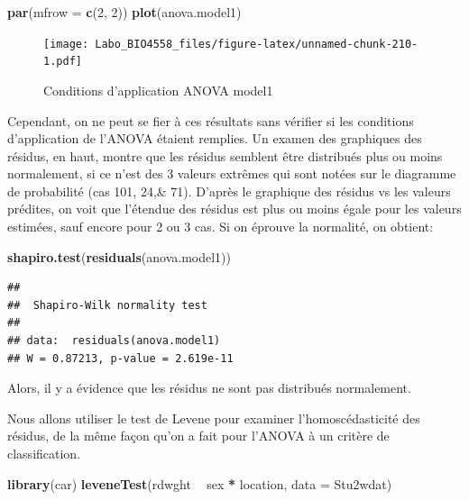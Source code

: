 \documentclass[12pt,]{book}
\newenvironment{Shaded}{\begin{snugshade}}{\end{snugshade}}
\newcommand{\DataTypeTok}[1]{\textcolor[rgb]{0.13,0.29,0.53}{#1}}
\newcommand{\DecValTok}[1]{\textcolor[rgb]{0.00,0.00,0.81}{#1}}
\newcommand{\KeywordTok}[1]{\textcolor[rgb]{0.13,0.29,0.53}{\textbf{#1}}}
\newcommand{\NormalTok}[1]{#1}
\newcommand{\OperatorTok}[1]{\textcolor[rgb]{0.81,0.36,0.00}{\textbf{#1}}}
\newcommand{\StringTok}[1]{\textcolor[rgb]{0.31,0.60,0.02}{#1}}
\begin{document}
\begin{Shaded}
\begin{Highlighting}[]
\KeywordTok{par}\NormalTok{(}\DataTypeTok{mfrow =} \KeywordTok{c}\NormalTok{(}\DecValTok{2}\NormalTok{, }\DecValTok{2}\NormalTok{))}
\KeywordTok{plot}\NormalTok{(anova.model1)}
\end{Highlighting}
\end{Shaded}

\begin{figure}
\centering
\texttt{[image: Labo\_BIO4558\_files/figure-latex/unnamed-chunk-210-1.pdf]}
\caption{\label{fig:unnamed-chunk-210}Conditions d'application ANOVA model1}
\end{figure}

Cependant, on ne peut se fier à ces résultats sans vérifier si les conditions d'application de l'ANOVA étaient remplies. Un examen des graphiques des résidus, en haut, montre que les résidus semblent être distribués plus ou moins normalement, si ce n'est des 3 valeurs extrêmes qui sont notées sur le diagramme de probabilité (cas 101, 24,\& 71). D'après le graphique des résidus vs les valeurs prédites, on voit que l'étendue des résidus est plus ou moins égale pour les valeurs estimées, sauf encore pour 2 ou 3 cas. Si on éprouve la normalité, on obtient:

\begin{Shaded}
\begin{Highlighting}[]
\KeywordTok{shapiro.test}\NormalTok{(}\KeywordTok{residuals}\NormalTok{(anova.model1))}
\end{Highlighting}
\end{Shaded}

\begin{verbatim}
## 
##  Shapiro-Wilk normality test
## 
## data:  residuals(anova.model1)
## W = 0.87213, p-value = 2.619e-11
\end{verbatim}

Alors, il y a évidence que les résidus ne sont pas distribués normalement.

Nous allons utiliser le test de Levene pour examiner l'homoscédasticité des résidus, de la même façon qu'on a fait pour l'ANOVA à un critère de classification.

\begin{Shaded}
\begin{Highlighting}[]
\KeywordTok{library}\NormalTok{(car)}
\KeywordTok{leveneTest}\NormalTok{(rdwght }\OperatorTok{~}\StringTok{ }\NormalTok{sex }\OperatorTok{*}\StringTok{ }\NormalTok{location, }\DataTypeTok{data =}\NormalTok{ Stu2wdat)}
\end{Highlighting}
\end{Shaded}
\end{document}
